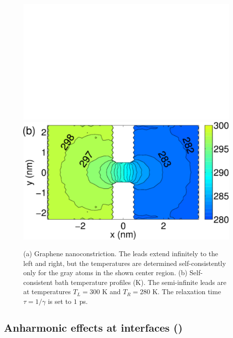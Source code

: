 \begin{figure}
 \begin{center}
 \includegraphics[width=.49\columnwidth]{pics/gf_fig8a.pdf}
 \includegraphics[width=.49\columnwidth]{pics/gf_fig8b.pdf}
 \end{center}
 \caption{(a) Graphene nanoconstriction. The leads extend infinitely to the left and right, but the temperatures are determined self-consistently only for the gray atoms in the shown center region. (b) Self-consistent bath temperature profiles (K). The semi-infinite leads are at temperatures $T_L=300$ K and $T_R=280$ K. The relaxation time $\tau=1/\gamma$ is set to $1$ ps.}
 \label{fig:gf_fig8}
\end{figure}

\subsection{Anharmonic effects at interfaces ()}

